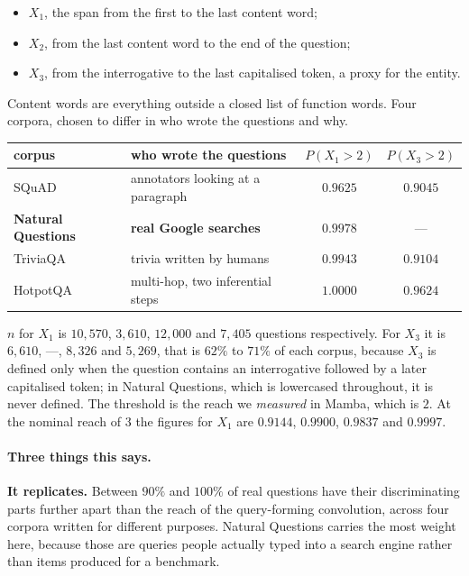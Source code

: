 \documentclass[10pt]{article}
\begin{document}
\begin{itemize}
\item $X_1$, the span from the first to the last content word;
\item $X_2$, from the last content word to the end of the question;
\item $X_3$, from the interrogative to the last capitalised token, a proxy for the entity.
\end{itemize}

Content words are everything outside a closed list of function words. Four corpora, chosen to differ
in who wrote the questions and why.

\begin{center}
\begin{tabular}{llcc}
\toprule
corpus & who wrote the questions & $P(X_1 > 2)$ & $P(X_3 > 2)$ \\
\midrule
SQuAD & annotators looking at a paragraph & $0.9625$ & $0.9045$ \\
\textbf{Natural Questions} & \textbf{real Google searches} & $\mathbf{0.9978}$ & --- \\
TriviaQA & trivia written by humans & $0.9943$ & $0.9104$ \\
HotpotQA & multi-hop, two inferential steps & $\mathbf{1.0000}$ & $0.9624$ \\
\bottomrule
\end{tabular}
\end{center}

$n$ for $X_1$ is $10{,}570$, $3{,}610$, $12{,}000$ and $7{,}405$ questions respectively. For $X_3$ it
is $6{,}610$, ---, $8{,}326$ and $5{,}269$, that is $62\%$ to $71\%$ of each corpus, because $X_3$ is
defined only when the question contains an interrogative followed by a later capitalised token; in
Natural Questions, which is lowercased throughout, it is never defined. The threshold is the reach we
\emph{measured} in Mamba, which is $2$. At the nominal reach of $3$ the figures for $X_1$ are
$0.9144$, $0.9900$, $0.9837$ and $0.9997$.

\paragraph{Three things this says.}

\textbf{It replicates.} Between $90\%$ and $100\%$ of real questions have their discriminating parts
further apart than the reach of the query-forming convolution, across four corpora written for
different purposes. Natural Questions carries the most weight here, because those are queries people
actually typed into a search engine rather than items produced for a benchmark.
\end{document}
